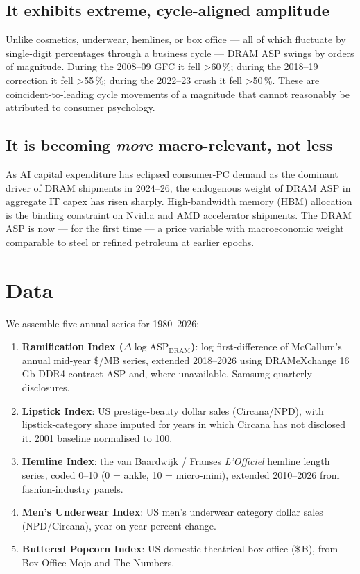\documentclass[11pt,a4paper]{article}
\begin{document}
\subsection{It exhibits extreme, cycle-aligned amplitude}

Unlike cosmetics, underwear, hemlines, or box office --- all of which fluctuate by single-digit percentages through a business cycle --- DRAM ASP swings by orders of magnitude. During the 2008--09 GFC it fell \textgreater60\,\%; during the 2018--19 correction it fell \textgreater55\,\%; during the 2022--23 crash it fell \textgreater50\,\%. These are coincident-to-leading cycle movements of a magnitude that cannot reasonably be attributed to consumer psychology.

\subsection{It is becoming \emph{more} macro-relevant, not less}

As AI capital expenditure has eclipsed consumer-PC demand as the dominant driver of DRAM shipments in 2024--26, the endogenous weight of DRAM ASP in aggregate IT capex has risen sharply. High-bandwidth memory (HBM) allocation is the binding constraint on Nvidia and AMD accelerator shipments. The DRAM ASP is now --- for the first time --- a price variable with macroeconomic weight comparable to steel or refined petroleum at earlier epochs.

\section{Data}
\label{sec:data}

We assemble five annual series for 1980--2026:

\begin{enumerate}
  \item \textbf{Ramification Index ($\Delta \log \mathrm{ASP}_{\mathrm{DRAM}}$)}: log first-difference of McCallum's annual mid-year $\$$/MB series, extended 2018--2026 using DRAMeXchange 16\,Gb DDR4 contract ASP and, where unavailable, Samsung quarterly disclosures.
  \item \textbf{Lipstick Index}: US prestige-beauty dollar sales (Circana/NPD), with lipstick-category share imputed for years in which Circana has not disclosed it. 2001 baseline normalised to 100.
  \item \textbf{Hemline Index}: the van Baardwijk / Franses \textit{L'Officiel} hemline length series, coded 0--10 (0 = ankle, 10 = micro-mini), extended 2010--2026 from fashion-industry panels.
  \item \textbf{Men's Underwear Index}: US men's underwear category dollar sales (NPD/Circana), year-on-year percent change.
  \item \textbf{Buttered Popcorn Index}: US domestic theatrical box office (\$\,B), from Box Office Mojo and The Numbers.
\end{enumerate}
\end{document}
